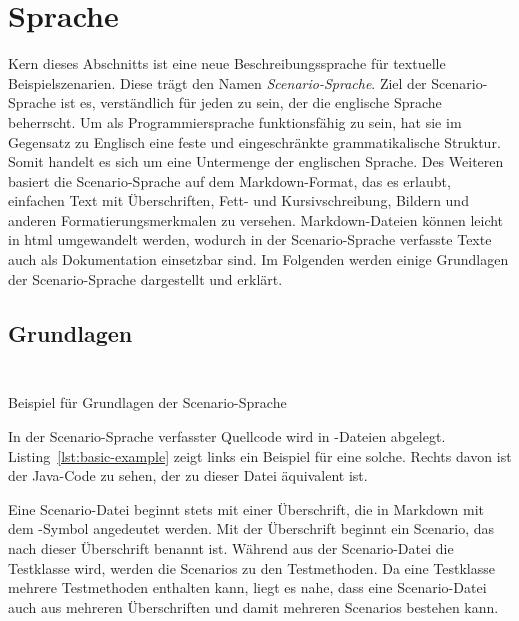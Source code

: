 \section{Sprache}\label{sec:language}

Kern dieses Abschnitts ist eine neue Beschreibungssprache für textuelle Beispielszenarien.
Diese trägt den Namen \emph{Scenario-Sprache}.
Ziel der Scenario-Sprache ist es, verständlich für jeden zu sein, der die englische Sprache beherrscht.
Um als Programmiersprache funktionsfähig zu sein, hat sie im Gegensatz zu Englisch eine feste und eingeschränkte grammatikalische Struktur.
Somit handelt es sich um eine Untermenge der englischen Sprache.
Des Weiteren basiert die Scenario-Sprache auf dem Markdown-Format, das es erlaubt, einfachen Text mit Überschriften, Fett- und Kursivschreibung, Bildern und anderen Formatierungsmerkmalen zu versehen.
Markdown-Dateien können leicht in \ac{html} umgewandelt werden, wodurch in der Scenario-Sprache verfasste Texte auch als Dokumentation einsetzbar sind.
Im Folgenden werden einige Grundlagen der Scenario-Sprache dargestellt und erklärt.

\subsection{Grundlagen}\label{subsec:basics}

\begin{listing}[htp]
    \begin{minipage}{0.45\textwidth}
        \centering
        \inputminted{md}{chapter/fulib-scenarios/scenarios/Basic.md}
    \end{minipage}
    \hspace{0.05\textwidth}
    \begin{minipage}{0.45\textwidth}
        \centering
        \inputminted{java}{chapter/fulib-scenarios/java/BasicTest.java}
    \end{minipage}
    \caption{Beispiel für Grundlagen der Scenario-Sprache}
    \label{lst:basic-example}
\end{listing}

In der Scenario-Sprache verfasster Quellcode wird in -Dateien abgelegt.
Listing~\ref{lst:basic-example} zeigt links ein Beispiel für eine solche.
Rechts davon ist der Java-Code zu sehen, der zu dieser Datei äquivalent ist.

Eine Scenario-Datei beginnt stets mit einer Überschrift, die in Markdown mit dem \mdcode{#}-Symbol angedeutet werden.
Mit der Überschrift beginnt ein Scenario, das nach dieser Überschrift benannt ist.
Während aus der Scenario-Datei die Testklasse wird, werden die Scenarios zu den Testmethoden.
Da eine Testklasse mehrere Testmethoden enthalten kann, liegt es nahe, dass eine Scenario-Datei auch aus mehreren Überschriften und damit mehreren Scenarios bestehen kann.


